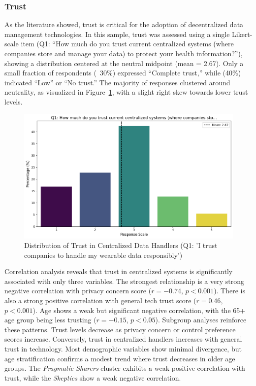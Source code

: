 	\subsubsection{Trust}
		As the literature showed, trust is critical for the adoption of decentralized data management technologies. In this sample, trust was assessed using a single Likert-scale item (Q1: “How much do you trust current centralized systems (where companies store and manage your data) to protect your health information?”), showing a distribution centered at the neutral midpoint (mean = 2.67). Only a small fraction of respondents (~30\%) expressed “Complete trust,” while (40\%) indicated “Low” or “No trust.” The majority of responses clustered around neutrality, as visualized in Figure~\ref{fig:trust_q1}, with a slight right skew towards lower trust levels. 
		\begin{figure}[h!]\centering
			\includegraphics[width=1\linewidth]{figures/questions/Q1_likert.png}
			\caption{Distribution of Trust in Centralized Data Handlers (Q1: 'I trust companies to handle my wearable data responsibly')}
			\label{fig:trust_q1}
		\end{figure}
		Correlation analysis reveals that trust in centralized systems is significantly associated with only three variables. The strongest relationship is a very strong negative correlation with privacy concern score ($r = -0.74$, $p < 0.001$). There is also a strong positive correlation with general tech trust score ($r = 0.46$, $p < 0.001$). Age shows a weak but significant negative correlation, with the 65+ age group being less trusting ($r = -0.15$, $p < 0.05$).
		Subgroup analyses reinforce these patterns. Trust levels decrease as privacy concern or control preference scores increase. Conversely, trust in centralized handlers increases with general trust in technology. Most demographic variables show minimal divergence, but age stratification confirms a modest trend where trust decreases in older age groups. The \textit{Pragmatic Sharers} cluster exhibits a weak positive correlation with trust, while the \textit{Skeptics} show a weak negative correlation.

